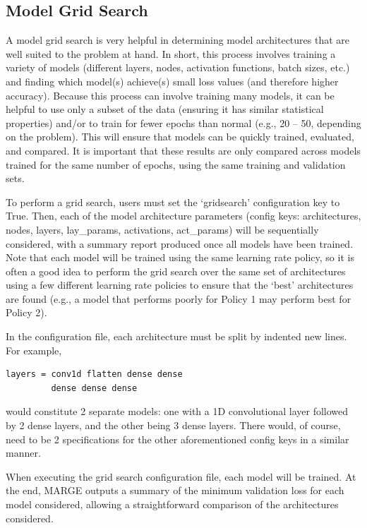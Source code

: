 \documentclass[letterpaper, 12pt]{article}
\begin{document}
\subsection{Model Grid Search}

A model grid search is very helpful in determining model architectures that are 
well suited to the problem at hand.  In short, this process involves training 
a variety of models (different layers, nodes, activation functions, batch 
sizes, etc.) and finding which model(s) achieve(s) small loss values (and 
therefore higher accuracy).  Because this process can involve training 
many models, it can be  helpful to use only a subset of the data (ensuring 
it has similar statistical properties) and/or to train for fewer epochs than 
normal (e.g., 20 -- 50, depending on the problem).  This will ensure that 
models can be quickly trained, evaluated, and compared.  It is important 
that these results are only compared across models trained for the same 
number of epochs, using the same training and validation sets. \newline

\noindent To perform a grid search, users must set the `gridsearch' 
configuration key to True.  Then, each of the model architecture parameters 
(config keys: architectures, nodes, layers, lay\_params, activations, 
act\_params)
will be sequentially considered, with a summary report produced once all 
models have been trained.  Note that each model will be trained using the same 
learning rate policy, so it is often a good idea to perform the grid search over
the same set of architectures using a few different learning rate policies to 
ensure that the `best' architectures are found (e.g., a model that performs 
poorly for Policy 1 may perform best for Policy 2). \newline

\noindent In the configuration file, each architecture must be split by indented
new lines.  For example, 
\begin{verbatim}
layers = conv1d flatten dense dense
         dense dense dense
\end{verbatim}
\noindent would constitute 2 separate models: one with a 1D convolutional layer 
followed by 2 dense layers, and the other being 3 dense layers.  There would, 
of course, need to be 2 specifications for the other aforementioned config keys 
in a similar manner.\newline

\noindent When executing the grid search configuration file, each model will 
be trained.  At the end, MARGE outputs a summary of the minimum validation loss 
for each model considered, allowing a straightforward comparison of the 
architectures considered.\newline
\end{document}
